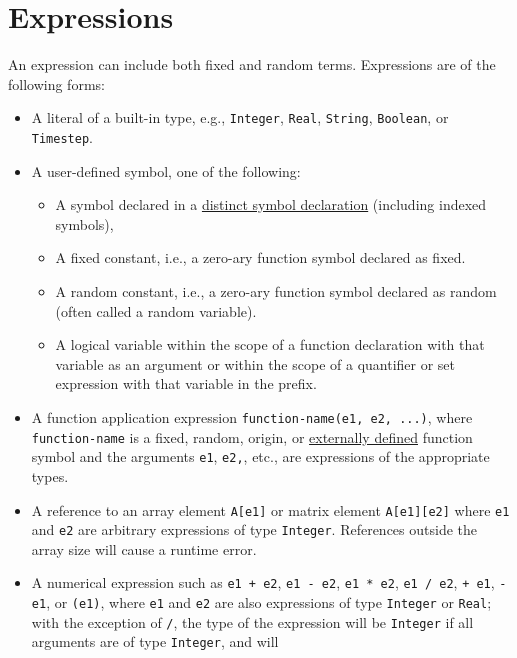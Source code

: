 \documentclass[12pt]{article}
\begin{document}
\section{Expressions}\label{expression-section}

An expression can include both fixed and random terms.  Expressions are of the following forms:
\begin{itemize}
\item A literal of a built-in type, e.g., {\tt Integer}, {\tt Real},
  {\tt String}, {\tt Boolean}, or {\tt Timestep}.
\item A user-defined symbol, one of the following:
\begin{itemize}
\item A symbol declared in a \hyperref[distinct-section]{distinct
  symbol declaration} (including indexed symbols),
\item A fixed constant, i.e., a zero-ary function symbol declared as fixed.
\item A random constant, i.e., a zero-ary function symbol declared as
  random (often called a random variable).
\item A logical variable within the scope of a function declaration
  with that variable as an argument or within the scope of a
  quantifier or set expression with that variable in the prefix.
\end{itemize}
\item A function application expression {\tt function-name(e1, e2,
  ...)}, where {\tt function-name} is a fixed, random, origin, or
  \hyperref[external-function-section]{externally defined} function
  symbol and the arguments {\tt e1}, {\tt e2,}, etc., are
  expressions of the appropriate types.
\item A reference to an array element {\tt A[e1]} or matrix element
  {\tt A[e1][e2]} where {\tt e1} and {\tt e2} are arbitrary
  expressions of type \verb|Integer|.%
  References outside the array size will cause a runtime error.
\item A numerical expression such as \texttt{e1 + e2}, \texttt{e1 - e2},
  \texttt{e1 * e2}, \texttt{e1 / e2},  \texttt{+ e1},
  \texttt{- e1}, or \texttt{(e1)}, 
  where \texttt{e1} and \texttt{e2} are also expressions of
  type \texttt{Integer} or \texttt{Real};
  with the exception of {\tt /}, the type of the expression will be
  {\tt Integer} if all arguments are of type {\tt Integer}, and will

\end{itemize}
\end{document}
